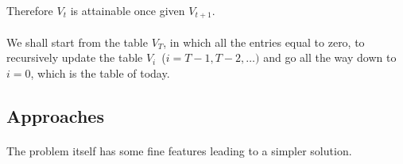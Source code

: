 \documentclass[11pt,reqno]{article}
\begin{document}
\paragraph{} Therefore $V_{t}$ is attainable once given $V_{t + 1}$.
\paragraph{} We shall start from the table $V_{T}$, in which all the entries equal to zero, to recursively update the table $V_{i}$~($i = T-1, T-2, \dots)$ and go all the way down to $i = 0$, which is the table of today.

\subsection*{Approaches}
\paragraph{} The problem itself has some fine features leading to a simpler solution. 
\end{document}
